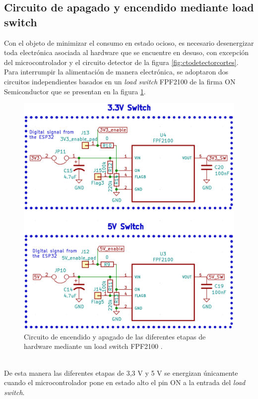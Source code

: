  \subsection{Circuito de apagado y encendido mediante load switch}
 Con el objeto de minimizar el consumo en estado ocioso, es necesario desenergizar toda electrónica asociada al hardware que se encuentre en desuso, con excepción del microcontrolador y el circuito detector de la figura \ref{fig:ctodetectorcortes}.\\
 Para interrumpir la alimentación de manera electrónica, se adoptaron dos circuitos independientes basados en un \textit{load switch} FPF2100 de la firma ON Semiconductor \citep{fpf2100} que se presentan en la figura \ref{fig:ctoloadswitch}.
 \begin{figure}[h]
 	\centering
 	\includegraphics[width=0.7\linewidth]{Figures/cto_load_switch}
 	\caption{Circuito de encendido y apagado de las diferentes etapas de hardware mediante un load switch FPF2100 \citep{fpf2100}.}
 	\label{fig:ctoloadswitch}
 \end{figure}\\
De esta manera las diferentes etapas de 3,3 V y 5 V se energizan únicamente cuando el microcontrolador pone en estado alto el pin ON a la entrada del \textit{load switch}.\\
 
